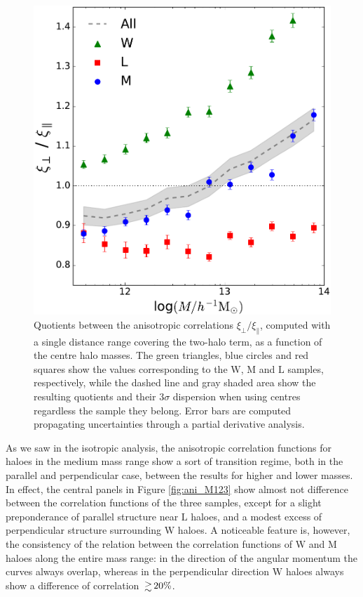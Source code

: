 \documentclass[fleqn,usenatbib]{mnras}
\newcommand{\Wh}{\mathrm{W}}
\newcommand{\Lh}{\mathrm{L}}
\newcommand{\Mh}{\mathrm{M}}
\begin{document}
\begin{figure}
	\includegraphics[width=\columnwidth]{400Mpc_figs/bines_2-6Mpc.pdf}
    \caption{Quotients between the anisotropic correlations $\xi_{\perp}/\xi_{\parallel}$, computed with a single distance range covering the two-halo term, as a function of the centre halo masses. The green triangles, blue circles and red squares show the values corresponding to the $\Wh$, $\Mh$ and $\Lh$ samples, respectively, while the dashed line and gray shaded area show the resulting quotients and their $3\sigma$ dispersion when using centres regardless the sample they belong. Error bars are computed propagating uncertainties through a partial derivative analysis.}
    \label{fig:gp_bines}
\end{figure}

As we saw in the isotropic analysis, the anisotropic correlation functions for haloes in the medium mass range show a sort of transition regime, both in the parallel and perpendicular case, between the results for higher and lower masses. In effect, the central panels in Figure \ref{fig:ani_M123} show almost not difference between the correlation functions of the three samples, except for a slight preponderance of parallel structure near $\Lh$ haloes, and a modest excess of perpendicular structure surrounding $\Wh$ haloes. A noticeable feature is, however, the consistency of the relation between the correlation functions of $\Wh$ and $\Mh$ haloes along the entire mass range: in the direction of the angular momentum the curves always overlap, whereas in the perpendicular direction $\Wh$ haloes always show a difference of correlation $\ga 20\%$. 
\end{document}

